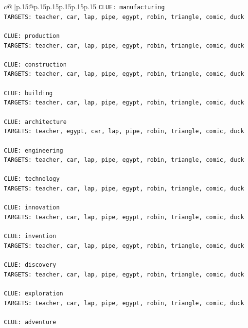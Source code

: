 \documentclass{article}
\begin{document}
{\begin{supertabular}{c@{$\;$}|p{.15\linewidth}@{}p{.15\linewidth}p{.15\linewidth}p{.15\linewidth}p{.15\linewidth}p{.15\linewidth}}
{{{\texttt{CLUE: manufacturing} \\
\texttt{TARGETS: teacher, car, lap, pipe, egypt, robin, triangle, comic, duck} \\
\\ 
\texttt{CLUE: production} \\
\texttt{TARGETS: teacher, car, lap, pipe, egypt, robin, triangle, comic, duck} \\
\\ 
\texttt{CLUE: construction} \\
\texttt{TARGETS: teacher, car, lap, pipe, egypt, robin, triangle, comic, duck} \\
\\ 
\texttt{CLUE: building} \\
\texttt{TARGETS: teacher, car, lap, pipe, egypt, robin, triangle, comic, duck} \\
\\ 
\texttt{CLUE: architecture} \\
\texttt{TARGETS: teacher, egypt, car, lap, pipe, robin, triangle, comic, duck} \\
\\ 
\texttt{CLUE: engineering} \\
\texttt{TARGETS: teacher, car, lap, pipe, egypt, robin, triangle, comic, duck} \\
\\ 
\texttt{CLUE: technology} \\
\texttt{TARGETS: teacher, car, lap, pipe, egypt, robin, triangle, comic, duck} \\
\\ 
\texttt{CLUE: innovation} \\
\texttt{TARGETS: teacher, car, lap, pipe, egypt, robin, triangle, comic, duck} \\
\\ 
\texttt{CLUE: invention} \\
\texttt{TARGETS: teacher, car, lap, pipe, egypt, robin, triangle, comic, duck} \\
\\ 
\texttt{CLUE: discovery} \\
\texttt{TARGETS: teacher, car, lap, pipe, egypt, robin, triangle, comic, duck} \\
\\ 
\texttt{CLUE: exploration} \\
\texttt{TARGETS: teacher, car, lap, pipe, egypt, robin, triangle, comic, duck} \\
\\ 
\texttt{CLUE: adventure} \\
}}}
\end{supertabular}}
\end{document}

